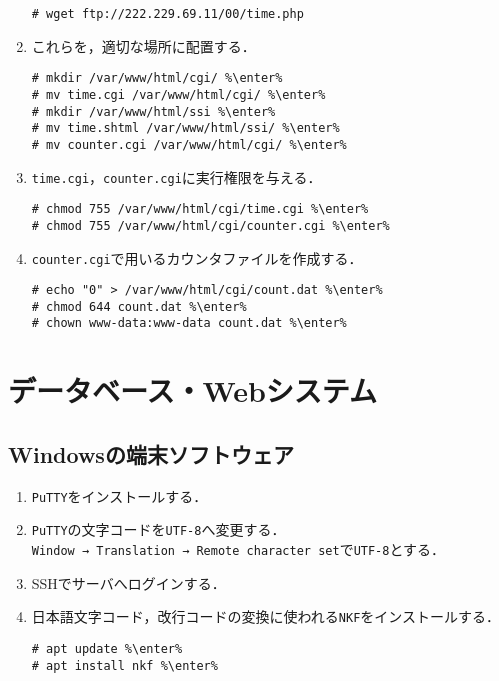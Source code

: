 \documentclass{jlreq}
\begin{document}
\begin{enumerate}
\begin{lstlisting}
# wget ftp://222.229.69.11/00/time.php
\end{lstlisting}
    \item これらを，適切な場所に配置する．
          \begin{lstlisting}
# mkdir /var/www/html/cgi/ %\enter%
# mv time.cgi /var/www/html/cgi/ %\enter%
# mkdir /var/www/html/ssi %\enter%
# mv time.shtml /var/www/html/ssi/ %\enter%
# mv counter.cgi /var/www/html/cgi/ %\enter%
\end{lstlisting}
    \item \texttt{time.cgi}，\texttt{counter.cgi}に実行権限を与える．
          \begin{lstlisting}
# chmod 755 /var/www/html/cgi/time.cgi %\enter%
# chmod 755 /var/www/html/cgi/counter.cgi %\enter%
\end{lstlisting}
    \item \texttt{counter.cgi}で用いるカウンタファイルを作成する．
          \begin{lstlisting}
# echo "0" > /var/www/html/cgi/count.dat %\enter%
# chmod 644 count.dat %\enter%
# chown www-data:www-data count.dat %\enter%
\end{lstlisting}
\end{enumerate}
\clearpage
\section{データベース・Webシステム}
\subsection{Windowsの端末ソフトウェア}
\begin{enumerate}
    \item \texttt{PuTTY}をインストールする．
    \item \texttt{PuTTY}の文字コードを\texttt{UTF-8}へ変更する．\\
          \texttt{Window → Translation → Remote character set}で\texttt{UTF-8}とする．
    \item SSHでサーバへログインする．
    \item 日本語文字コード，改行コードの変換に使われる\texttt{NKF}をインストールする．
          \begin{lstlisting}
# apt update %\enter%
# apt install nkf %\enter%
\end{lstlisting}
\end{enumerate}
\end{document}
